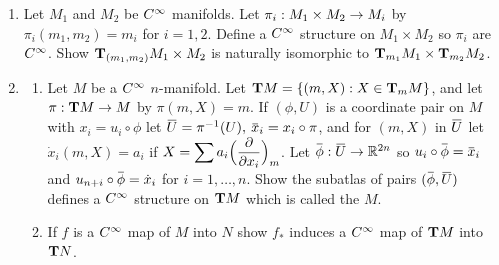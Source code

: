 \documentclass[../main]{subfiles}
\begin{document}
\begin{enumerate}
\item\label{pro:18} Let $M_1$ and $M_2$ be $\CInfty$ manifolds. Let $\pi_i : M_1 \times M_2 \functionMaps M_i$ by $\pi_i (m_1, m_2) = m_i$ for $i=1,2$. Define a $\CInfty$ structure on $M_1 \times M_2$ so $\pi_i$ are $\CInfty$. Show $\tangentspace{M_1 \times M_2}{(m_1, m_2)}$ is naturally isomorphic to $\tangentspace{M_1}{m_1} \times \tangentspace{M_2}{m_2}$.


\item\label{pro:19}
\begin{enumerate}[label=(\roman{enumii})]
    \item Let $M$ be a $\CInfty$ $n$-manifold. Let $\tangentbundle{M} = \{(m,X): X \in \tangentspace{M}{m}\}$, and let $\pi: \tangentbundle{M} \functionMaps M$ by $\pi(m,X) = m$. If $(\phi, U)$ is a coordinate pair on $M$ with $x_i = u_i \circ \phi$ let $\xoverline{U} = \pi \inv (U),$ $\xoverline{x}_i = x_i \circ \pi$, and for $(m,X)$ in $\xoverline{U}$ let $\dot{x}_i (m,X) = a_i$ if $X = \displaystyle\sum a_i \Big(\pdv{}{x_i}\Big)_m$. Let $\xoverline{\phi}: \xoverline{U} \functionMaps \bR^{2n}$ so $u_i \circ \xoverline{\phi} = \xoverline{x}_i$ and $u_{n+i} \circ \xoverline{\phi} = \dot{x}_i$ for $i=1, \dots,n$. Show the subatlas of pairs $(\xoverline{\phi}, \xoverline{U})$ defines a $\CInfty$ structure on $\tangentbundle{M}$ which is called the  $M$.
    \item If $f$ is a $\CInfty$ map of $M$ into $N$ show $f_*$ induces a $\CInfty$ map of $\tangentbundle{M}$ into $\tangentbundle{N}$.
\end{enumerate}



\end{enumerate}
\end{document}
